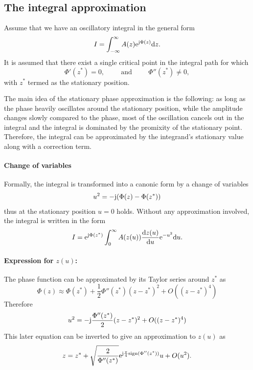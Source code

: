 \documentclass[11pt]{article}
\begin{document}
\subsection{The integral approximation}

Assume that we have an oscillatory integral in the general form
\begin{equation}
    I = \int_{-\infty}^{\infty} A(z) \mathrm{e}^{ \mathrm{j} \Phi(z) }  \mathrm{d} z.
\end{equation}
It is assumed that there exist a single critical point in the integral path for which
\begin{equation}
    \Phi'(z^*) = 0, \hspace{1cm} \text{and} \hspace{1cm} \Phi''(z^*) \neq 0,
\end{equation}
with $z^*$ termed as the stationary position. 

The main idea of the stationary phase approximation is the following: as long as the phase heavily oscillates around the stationary position, while the amplitude changes slowly compared to the phase, most of the oscillation cancels out in the integral and the integral is dominated by the promixity of the stationary point.
Therefore, the integral can be approximated by the integrand's stationary value along with a correction term.

\paragraph{Change of variables}
Formally, the integral is transformed into a canonic form by a change of variables
\begin{equation}
u^2 = -\mathrm{j} (\Phi(z) - \Phi(z^*))
\label{eq:u_def}
\end{equation}
thus at the stationary position $u=0$ holds.
Without any approximation involved, the integral is written in the form
\begin{equation}
    I = \mathrm{e}^{ \mathrm{j} \Phi(z^*) } \int_{0}^{\infty} A(z(u))\frac{\mathrm{d} z(u)}{\mathrm{d} u}  \mathrm{e}^{ -u^2 }  \mathrm{d} u.
\end{equation}

\paragraph{Expression for $z(u)$:}
The phase function can be approximated by its Taylor series around $z^*$ as
\begin{equation}
     \Phi(z) \approx \Phi(z^*) + \frac{1}{2}\Phi''(z^*) (z-z^*)^2 + O((z-z^*)^4)
\end{equation}
Therefore
\begin{equation}
    u^2 = -\mathrm{j} \frac{\Phi''(z^*)}{2} (z-z^*)^2 + O((z-z^*)^4)
\end{equation}
This later equation can be inverted to give an approximation to $z(u)$ as
\begin{equation}
   z =   z^* + \sqrt{ \frac{2}{ \Phi''(z^*)} }\mathrm{e}^{\mathrm{j} \frac{\pi}{4} \text{sign}(\Phi''(z^*)) }  u + O(u^2).
\end{equation}
\end{document}
